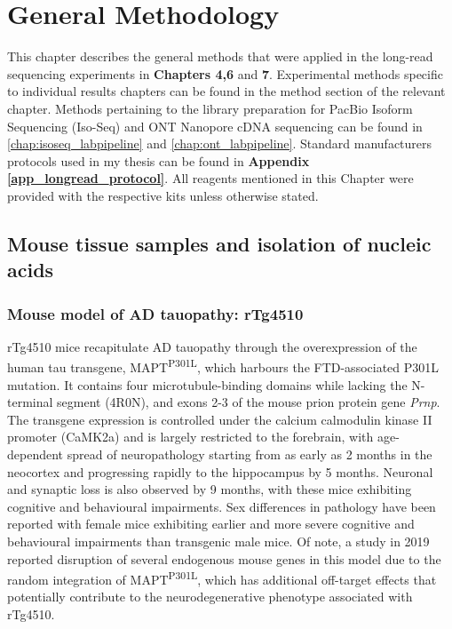 \chapter{General Methodology}\label{ch: general methodology}

This chapter describes the general methods that were applied in the long-read sequencing experiments in \textbf{Chapters 4,6} and \textbf{7}. Experimental methods specific to individual results chapters can be found in the method section of the relevant chapter. Methods pertaining to the library preparation for PacBio Isoform Sequencing (Iso-Seq) and ONT Nanopore cDNA sequencing can be found in \cref{chap:isoseq_labpipeline} and \cref{chap:ont_labpipeline}. Standard manufacturers protocols used in my thesis can be found in \textbf{Appendix \ref{app_longread_protocol}}. All reagents mentioned in this Chapter were provided with the respective kits unless otherwise stated.

\section{Mouse tissue samples and isolation of nucleic acids}

\subsection{Mouse model of AD tauopathy: rTg4510} 
rTg4510 mice recapitulate AD tauopathy through the overexpression of the human tau transgene, MAPT\textsuperscript{P301L}, which harbours the FTD-associated P301L mutation. It contains four microtubule-binding domains while lacking the N-terminal segment (4R0N), and exons 2-3 of the mouse prion protein gene \textit{Prnp}. The transgene expression is controlled under the calcium calmodulin kinase II promoter (CaMK2a) and is largely restricted to the forebrain, with age-dependent spread of neuropathology starting from as early as 2 months in the neocortex and progressing rapidly to the hippocampus by 5 months. Neuronal and synaptic loss is also observed by 9 months, with these mice exhibiting cognitive and behavioural impairments. Sex differences in pathology have been reported with female mice exhibiting earlier and more severe cognitive and behavioural impairments than transgenic male mice\cite{M2011}. Of note, a study in 2019 reported disruption of several endogenous mouse genes in this model due to the random integration of MAPT\textsuperscript{P301L}, which has additional off-target effects that potentially contribute to the neurodegenerative phenotype associated with rTg4510\cite{Gamache2019}. 
 

